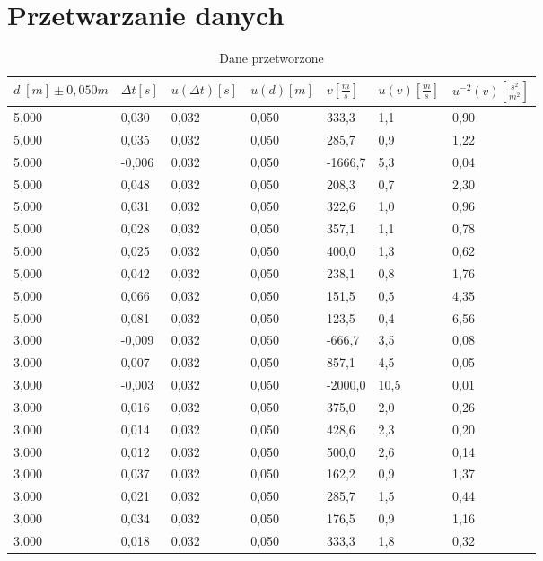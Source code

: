 \documentclass[a4paper,12pt]{article}
\begin{document}
\section{Przetwarzanie danych}

\begin{table}[p]
\centering
\begin{tabular}{|l|l|l|l|l|l|l|}
\hline
$d\; \left[m\right] \pm 0,050m$ & $\Delta t \left[s\right]$ & $u(\Delta t) \left[s\right]$ & $u(d) \left[m\right]$ & $v \left[\frac{m}{s}\right]$ & $u(v) \left[\frac{m}{s}\right]$ & $u^{-2}(v) \left[\frac{s^2}{m^2}\right]$ \\ \hline\hline
5,000 & 0,030  & 0,032 & 0,050 & 333,3   & 1,1  & 0,90 \\ \hline
5,000 & 0,035  & 0,032 & 0,050 & 285,7   & 0,9  & 1,22 \\ \hline
5,000 & -0,006 & 0,032 & 0,050 & -1666,7 & 5,3  & 0,04 \\ \hline
5,000 & 0,048  & 0,032 & 0,050 & 208,3   & 0,7  & 2,30 \\ \hline
5,000 & 0,031  & 0,032 & 0,050 & 322,6   & 1,0  & 0,96 \\ \hline
5,000 & 0,028  & 0,032 & 0,050 & 357,1   & 1,1  & 0,78 \\ \hline
5,000 & 0,025  & 0,032 & 0,050 & 400,0   & 1,3  & 0,62 \\ \hline
5,000 & 0,042  & 0,032 & 0,050 & 238,1   & 0,8  & 1,76 \\ \hline
5,000 & 0,066  & 0,032 & 0,050 & 151,5   & 0,5  & 4,35 \\ \hline
5,000 & 0,081  & 0,032 & 0,050 & 123,5   & 0,4  & 6,56 \\ \hline
3,000 & -0,009 & 0,032 & 0,050 & -666,7  & 3,5  & 0,08 \\ \hline
3,000 & 0,007  & 0,032 & 0,050 & 857,1   & 4,5  & 0,05 \\ \hline
3,000 & -0,003 & 0,032 & 0,050 & -2000,0 & 10,5 & 0,01 \\ \hline
3,000 & 0,016  & 0,032 & 0,050 & 375,0   & 2,0  & 0,26 \\ \hline
3,000 & 0,014  & 0,032 & 0,050 & 428,6   & 2,3  & 0,20 \\ \hline
3,000 & 0,012  & 0,032 & 0,050 & 500,0   & 2,6  & 0,14 \\ \hline
3,000 & 0,037  & 0,032 & 0,050 & 162,2   & 0,9  & 1,37 \\ \hline
3,000 & 0,021  & 0,032 & 0,050 & 285,7   & 1,5  & 0,44 \\ \hline
3,000 & 0,034  & 0,032 & 0,050 & 176,5   & 0,9  & 1,16 \\ \hline
3,000 & 0,018  & 0,032 & 0,050 & 333,3   & 1,8  & 0,32 \\ \hline
\end{tabular}
\caption{Dane przetworzone}
\label{tab:proc}
\end{table}
\end{document}
